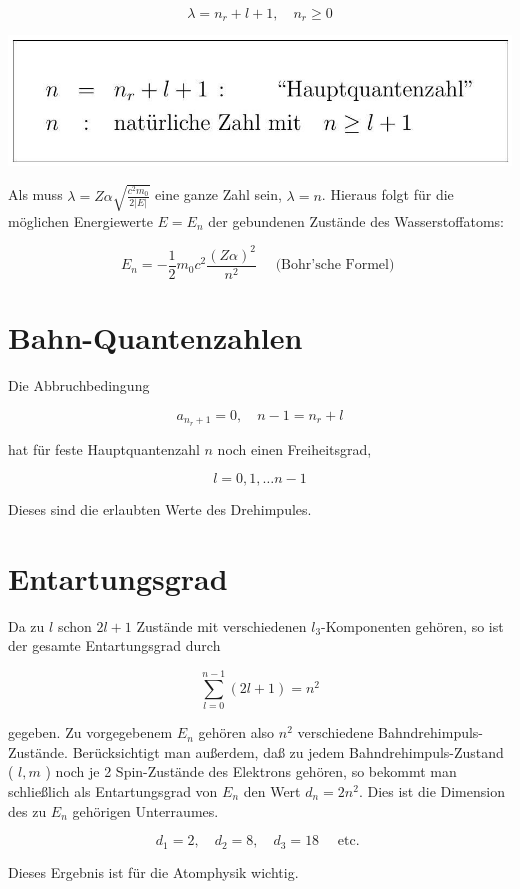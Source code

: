 \documentclass[10pt, letterpaper]{article}
\begin{document}
$$
\lambda=n_{r}+l+1, \quad n_{r} \geq 0
$$

\begin{center}
\includegraphics[scale=0.2]{2025_05_21_d5590f158a899e385c7cg-05}
\end{center}

Als muss $\lambda=Z \alpha \sqrt{\frac{c^{2} m_{0}}{2|E|}}$ eine ganze Zahl sein, $\lambda=n$. Hieraus folgt für die möglichen Energiewerte $E=E_{n}$ der gebundenen Zustände des Wasserstoffatoms:

$$
E_{n}=-\frac{1}{2} m_{0} c^{2} \frac{(Z \alpha)^{2}}{n^{2}} \quad \text { (Bohr'sche Formel) }
$$

\section*{Bahn-Quantenzahlen}
Die Abbruchbedingung

$$
a_{n_{r}+1}=0, \quad n-1=n_{r}+l
$$

hat für feste Hauptquantenzahl $n$ noch einen Freiheitsgrad,

$$
l=0,1, \ldots n-1
$$

Dieses sind die erlaubten Werte des Drehimpules.

\section*{Entartungsgrad}
Da zu $l$ schon $2 l+1$ Zustände mit verschiedenen $l_{3}$-Komponenten gehören, so ist der gesamte Entartungsgrad durch

$$
\sum_{l=0}^{n-1}(2 l+1)=n^{2}
$$

gegeben. Zu vorgegebenem $E_{n}$ gehören also $n^{2}$ verschiedene Bahndrehimpuls-Zustände. Berücksichtigt man außerdem, daß zu jedem Bahndrehimpuls-Zustand ( $l, m$ ) noch je 2 Spin-Zustände des Elektrons gehören, so bekommt man schließlich als Entartungsgrad von $E_{n}$ den Wert $d_{n}=2 n^{2}$. Dies ist die Dimension des zu $E_{n}$ gehörigen Unterraumes.

$$
d_{1}=2, \quad d_{2}=8, \quad d_{3}=18 \quad \text { etc. }
$$

Dieses Ergebnis ist für die Atomphysik wichtig.
\end{document}
